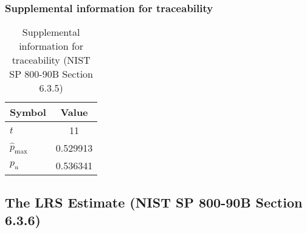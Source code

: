 \documentclass[a3paper,xelatex,english]{bxjsarticle}
\begin{document}
\subsubsection{Supplemental information for traceability}
\renewcommand{\arraystretch}{1.8}
\begin{table}[h]
\caption{Supplemental information for traceability (NIST SP 800-90B Section 6.3.5)}
\begin{center}
\begin{tabular}{|l|c|}
\hline 
\rowcolor{anotherlightblue} %
Symbol				& Value \\ \hline 
$t$				&       11\\ \hline 
$\hat{p}_{\textrm{max}}$ 			& 0.529913\\ \hline
$p_u$				& 0.536341\\ \hline
\end{tabular}
\end{center}
\end{table}
\renewcommand{\arraystretch}{1.4}
\clearpage
\subsection{The LRS Estimate (NIST SP 800-90B Section 6.3.6)}\label{sec:Binary636}
\end{document}
